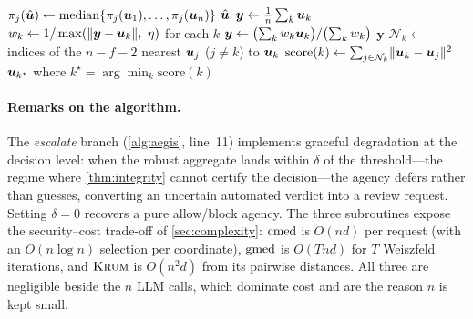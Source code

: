 \begin{algorithm}[t]
\caption{Robust aggregation subroutines $\Agg(\verd_1,\dots,\verd_n)$}
\label{alg:agg}
\begin{algorithmic}[1]
    \State $\pi_j(\hat{\bm{u}}) \gets \operatorname{median}\{\pi_j(\bm{u}_1),\dots,\pi_j(\bm{u}_n)\}$
  \EndFor
  \State \Return $\hat{\bm{u}}$
\EndFunction
\Statex
{}
  \State $\bm y \gets \tfrac1n\sum_k \bm{u}_k$
  \Repeat
    \State $w_k \gets 1/\max(\lVert \bm y - \bm{u}_k\rVert,\ \eta)$ for each $k$
    \State $\bm y \gets \bigl(\sum_k w_k \bm{u}_k\bigr)/\bigl(\sum_k w_k\bigr)$
  \State \Return $\bm y$
\EndFunction
\Statex
{}
    \State $\mathcal N_k \gets$ indices of the $n-f-2$ nearest $\bm{u}_j$ ($j\neq k$) to $\bm{u}_k$
    \State $\text{score}(k) \gets \sum_{j\in\mathcal N_k}\lVert \bm{u}_k - \bm{u}_j\rVert^2$
  \EndFor
  \State \Return $\bm{u}_{k^\star}$ where $k^\star = \arg\min_k \text{score}(k)$
\EndFunction
\end{algorithmic}
\end{algorithm}

\paragraph{Remarks on the algorithm.}
The \emph{escalate} branch (\cref{alg:aegis}, line~11) implements graceful degradation at
the decision level: when the robust aggregate lands within $\delta$ of the threshold—the
regime where \cref{thm:integrity} cannot certify the decision—the agency defers rather
than guesses, converting an uncertain automated verdict into a review request. Setting
$\delta=0$ recovers a pure allow/block agency. The three subroutines expose the
security--cost trade-off of \cref{sec:complexity}: $\operatorname{cmed}$ is $O(nd)$ per request (with an
$O(n\log n)$ selection per coordinate), $\operatorname{gmed}$ is $O(Tnd)$ for $T$ Weiszfeld iterations,
and $\textsc{Krum}$ is $O(n^2 d)$ from its pairwise distances. All three are negligible beside the
$n$ LLM calls, which dominate cost and are the reason $n$ is kept small.
